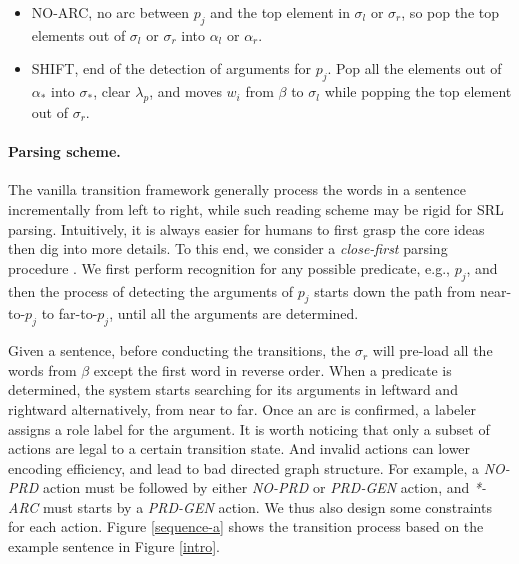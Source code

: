 \documentclass[letterpaper]{article} %
\begin{document}
\begin{CJK}{UTF8}{gbsn}
\begin{itemize}
    \item NO-ARC, no arc between $p_j$ and the top element in $\sigma_l$ or $\sigma_r$, so pop the top elements out of $\sigma_l$ or $\sigma_r$ into $\alpha_l$ or $\alpha_r$.


    \item SHIFT, end of the detection of arguments for $p_j$. Pop all the elements out of $\alpha_{*}$ into $\sigma_{*}$, clear $\lambda_p$, and moves $w_i$ from $\beta$ to $\sigma_l$ while popping the top element out of $\sigma_r$.

\end{itemize}


\vspace{-10pt}
\paragraph{Parsing scheme.}
The vanilla transition framework generally process the words in a sentence incrementally from left to right, while such reading scheme may be rigid for SRL parsing.
Intuitively, it is always easier for humans to first grasp the core ideas then dig into more details.
To this end, we consider a \emph{close-first} parsing procedure \cite{goldberg-elhadad-2010-efficient,cai-lam-2019-core,kurita-sogaard-2019-multi}.
We first perform recognition for any possible predicate, e.g., $p_j$, and then the process of detecting the arguments of $p_j$ starts down the path from near-to-$p_j$ to far-to-$p_j$, until all the arguments are determined.



Given a sentence, before conducting the transitions, the $\sigma_r$ will pre-load all the words from $\beta$ except the first word in reverse order.
When a predicate is determined, the system starts searching for its arguments in leftward and rightward alternatively, from near to far.
Once an arc is confirmed, a labeler assigns a role label for the argument.
It is worth noticing that only a subset of actions are legal to a certain transition state.
And invalid actions can lower encoding efficiency, and lead to bad directed graph structure.
For example, a \emph{NO-PRD} action must be followed by either \emph{NO-PRD} or \emph{PRD-GEN} action, and \emph{*-ARC} must starts by a \emph{PRD-GEN} action.
We thus also design some constraints for each action.
Figure \ref{sequence-a} shows the transition process based on the example sentence in Figure \ref{intro}.







\end{CJK}
\end{document}
